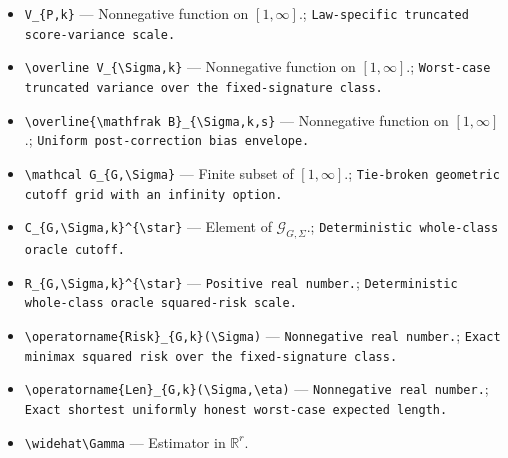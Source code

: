 \documentclass{article}
\begin{document}
\begin{itemize}
  \item \texttt{V\_\allowbreak{}\{P,\allowbreak{}k\}\allowbreak{}} --- Nonnegative function on \([1,\infty]\).; \texttt{Law-\allowbreak{}specific truncated score-\allowbreak{}variance scale.}
  \item \texttt{\textbackslash{}\allowbreak{}overline V\_\allowbreak{}\{\textbackslash{}\allowbreak{}Sigma,\allowbreak{}k\}\allowbreak{}} --- Nonnegative function on \([1,\infty]\).; \texttt{Worst-\allowbreak{}case truncated variance over the fixed-\allowbreak{}signature class.}
  \item \texttt{\textbackslash{}\allowbreak{}overline\{\textbackslash{}\allowbreak{}mathfrak B\}\allowbreak{}\_\allowbreak{}\{\textbackslash{}\allowbreak{}Sigma,\allowbreak{}k,\allowbreak{}s\}\allowbreak{}} --- Nonnegative function on \([1,\infty]\).; \texttt{Uniform post-\allowbreak{}correction bias envelope.}
  \item \texttt{\textbackslash{}\allowbreak{}mathcal G\_\allowbreak{}\{G,\allowbreak{}\textbackslash{}\allowbreak{}Sigma\}\allowbreak{}} --- Finite subset of \([1,\infty]\).; \texttt{Tie-\allowbreak{}broken geometric cutoff grid with an infinity option.}
  \item \texttt{C\_\allowbreak{}\{G,\allowbreak{}\textbackslash{}\allowbreak{}Sigma,\allowbreak{}k\}\allowbreak{}\textasciicircum{}\{\textbackslash{}\allowbreak{}star\}\allowbreak{}} --- Element of \(\mathcal G_{G,\Sigma}\).; \texttt{Deterministic whole-\allowbreak{}class oracle cutoff.}
  \item \texttt{R\_\allowbreak{}\{G,\allowbreak{}\textbackslash{}\allowbreak{}Sigma,\allowbreak{}k\}\allowbreak{}\textasciicircum{}\{\textbackslash{}\allowbreak{}star\}\allowbreak{}} --- \texttt{Positive real number.}; \texttt{Deterministic whole-\allowbreak{}class oracle squared-\allowbreak{}risk scale.}
  \item \texttt{\textbackslash{}\allowbreak{}operatorname\{Risk\}\allowbreak{}\_\allowbreak{}\{G,\allowbreak{}k\}\allowbreak{}(\textbackslash{}\allowbreak{}Sigma)} --- \texttt{Nonnegative real number.}; \texttt{Exact minimax squared risk over the fixed-\allowbreak{}signature class.}
  \item \texttt{\textbackslash{}\allowbreak{}operatorname\{Len\}\allowbreak{}\_\allowbreak{}\{G,\allowbreak{}k\}\allowbreak{}(\textbackslash{}\allowbreak{}Sigma,\allowbreak{}\textbackslash{}\allowbreak{}eta)} --- \texttt{Nonnegative real number.}; \texttt{Exact shortest uniformly honest worst-\allowbreak{}case expected length.}
  \item \texttt{\textbackslash{}\allowbreak{}widehat\textbackslash{}\allowbreak{}Gamma} --- Estimator in \(\mathbb R^r\).

\end{itemize}
\end{document}
